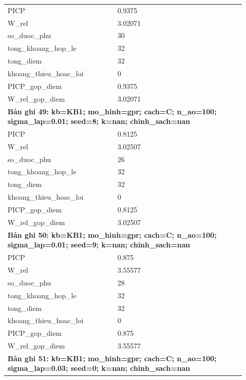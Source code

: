 \begin{longtable}{p{0.43\linewidth}p{0.50\linewidth}}
PICP & 0.9375 \\
W\_\allowbreak rel & 3.02071 \\
so\_\allowbreak duoc\_\allowbreak phu & 30 \\
tong\_\allowbreak khoang\_\allowbreak hop\_\allowbreak le & 32 \\
tong\_\allowbreak diem & 32 \\
khoang\_\allowbreak thieu\_\allowbreak hoac\_\allowbreak loi & 0 \\
PICP\_\allowbreak gop\_\allowbreak diem & 0.9375 \\
W\_\allowbreak rel\_\allowbreak gop\_\allowbreak diem & 3.02071 \\
\midrule
\multicolumn{2}{p{0.95\linewidth}}{\textbf{Bản ghi 49: kb=KB1; mo\_hinh=gpr; cach=C; n\_ao=100; sigma\_lap=0.01; seed=8; k=nan; chinh\_sach=nan}} \\
PICP & 0.8125 \\
W\_\allowbreak rel & 3.02507 \\
so\_\allowbreak duoc\_\allowbreak phu & 26 \\
tong\_\allowbreak khoang\_\allowbreak hop\_\allowbreak le & 32 \\
tong\_\allowbreak diem & 32 \\
khoang\_\allowbreak thieu\_\allowbreak hoac\_\allowbreak loi & 0 \\
PICP\_\allowbreak gop\_\allowbreak diem & 0.8125 \\
W\_\allowbreak rel\_\allowbreak gop\_\allowbreak diem & 3.02507 \\
\midrule
\multicolumn{2}{p{0.95\linewidth}}{\textbf{Bản ghi 50: kb=KB1; mo\_hinh=gpr; cach=C; n\_ao=100; sigma\_lap=0.01; seed=9; k=nan; chinh\_sach=nan}} \\
PICP & 0.875 \\
W\_\allowbreak rel & 3.55577 \\
so\_\allowbreak duoc\_\allowbreak phu & 28 \\
tong\_\allowbreak khoang\_\allowbreak hop\_\allowbreak le & 32 \\
tong\_\allowbreak diem & 32 \\
khoang\_\allowbreak thieu\_\allowbreak hoac\_\allowbreak loi & 0 \\
PICP\_\allowbreak gop\_\allowbreak diem & 0.875 \\
W\_\allowbreak rel\_\allowbreak gop\_\allowbreak diem & 3.55577 \\
\midrule
\multicolumn{2}{p{0.95\linewidth}}{\textbf{Bản ghi 51: kb=KB1; mo\_hinh=gpr; cach=C; n\_ao=100; sigma\_lap=0.03; seed=0; k=nan; chinh\_sach=nan}} \\

\end{longtable}
